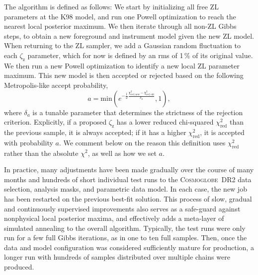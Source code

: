 \documentclass[twocolumn]{aa}
\newcommand{\cosmoglobe}{\textsc{Cosmoglobe}}
\begin{document}
The algorithm is defined as follows: We start by initializing all free
ZL parameters at the K98 model, and run one Powell optimization to
reach the nearest local posterior maximum. We then iterate through all
non-ZL Gibbs steps, to obtain a new foreground and instrument model
given the new ZL model. When returning to the ZL sampler, we add a
Gaussian random fluctuation to each $\zeta_{\mathrm{z}}$ parameter,
which for now is defined by an rms of 1\,\% of its original value. We
then run a new Powell optimization to identify a new local ZL
parameter maximum. This new model is then accepted or rejected based
on the following Metropolis-like accept probability,
\begin{equation}
a = \mathrm{min}\left(e^{-\frac{1}{2}\frac{\chi^2_{\mathrm{red,new}}-\chi^2_\mathrm{red,old}}{\delta_{a}}},1\right),
\label{eq:accept}
\end{equation}
where $\delta_a$ is a tunable parameter that determines the strictness
of the rejection criterion. Explicitly, if a proposed
$\zeta_{\mathrm{z}}$ has a lower reduced chi-squared $\chi_{\mathrm{red}}^2$ than the
previous sample, it is always accepted; if it has a higher
$\chi_{\mathrm{red}}^2$, it is accepted with probability $a$. We
comment below on the reason this definition uses $\chi^2_{\mathrm{red}}$
rather than the absolute $\chi^2$, as well as how we set $a$.

In practice, many adjustments have been made gradually over the course
of many months and hundreds of short individual test runs to the
\cosmoglobe\ DR2 data selection, analysis masks, and parametric data
model. In each case, the new job has been restarted on the previous
best-fit solution. This process of slow, gradual and continuously
supervised improvements also serves as a safe-guard against nonphysical
local posterior maxima, and effectively adds a meta-layer of simulated
annealing to the overall algorithm. Typically, the test runs were only
run for a few full Gibbs iterations, as in one to ten full
samples. Then, once the data and model configuration was considered
sufficiently mature for production, a longer run with hundreds of
samples distributed over multiple chains were produced.
\end{document}

